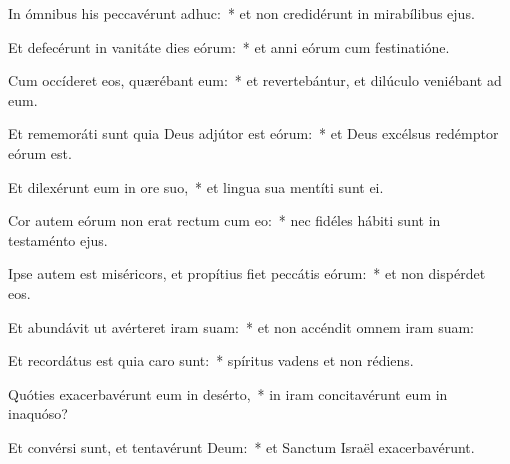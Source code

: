 
\item In ómnibus his peccavérunt adhuc:~* et non credidérunt in mirabílibus ejus.

\item Et defecérunt in vanitáte dies eórum:~* et anni eórum cum festinatióne.

\item Cum occíderet eos, quærébant eum:~* et revertebántur, et dilúculo veniébant ad eum.

\item Et rememoráti sunt quia Deus adjútor est eórum:~* et Deus excélsus redémptor eórum est.

\item Et dilexérunt eum in ore suo,~* et lingua sua mentíti sunt ei.

\item Cor autem eórum non erat rectum cum eo:~* nec fidéles hábiti sunt in testaménto ejus.

\item Ipse autem est miséricors, et propítius fiet peccátis eórum:~* et non dispérdet eos.

\item Et abundávit ut avérteret iram suam:~* et non accéndit omnem iram suam:

\item Et recordátus est quia caro sunt:~* spíritus vadens et non rédiens.

\item Quóties exacerbavérunt eum in desérto,~* in iram concitavérunt eum in inaquóso?

\item Et convérsi sunt, et tentavérunt Deum:~* et Sanctum Israël exacerbavérunt.
